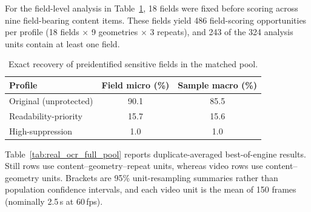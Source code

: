 \documentclass{ieeeaccess}
\begin{document}
For the field-level analysis in Table~\ref{tab:explicit_fields}, 18 fields were fixed before scoring across nine field-bearing content items. These fields yield 486 field-scoring opportunities per profile (18 fields $\times$ 9 geometries $\times$ 3 repeats), and 243 of the 324 analysis units contain at least one field.

\begin{table}[!t]
\caption{Exact recovery of preidentified sensitive fields in the matched pool.}
\label{tab:explicit_fields}
\centering
\footnotesize
\setlength{\tabcolsep}{4.5pt}
\begin{tabular}{lcc}
\toprule
Profile & Field micro (\%) & Sample macro (\%) \\
\midrule
Original (unprotected) & 90.1 & 85.5 \\
Readability-priority & 15.7 & 15.6 \\
High-suppression & 1.0 & 1.0 \\
\bottomrule
\end{tabular}
\end{table}

Table~\ref{tab:real_ocr_full_pool} reports duplicate-averaged best-of-engine results. Still rows use content--geometry--repeat units, whereas video rows use content--geometry units. Brackets are 95\% unit-resampling summaries rather than population confidence intervals, and each video unit is the mean of 150 frames (nominally 2.5\,s at 60\,fps).
\end{document}
